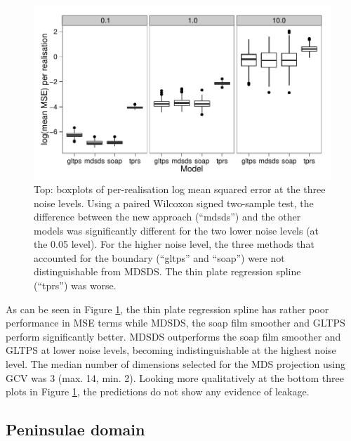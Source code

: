 \documentclass[useAMS, referee]{biom}
\begin{document}
\begin{figure}
\centering
\includegraphics[width=\textwidth]{examples/ramsay/ramsay-result.pdf}
\caption{Top: boxplots of per-realisation log mean squared error at the three noise levels. Using a paired Wilcoxon signed two-sample test, the difference between the new approach (``mdsds'') and the other models was significantly different for the two lower noise levels (at the 0.05 level). For the higher noise level, the three methods that accounted for the boundary (``gltps'' and ``soap'') were not distinguishable from MDSDS. The thin plate regression spline (``tprs'') was worse.
\label{ramsay-results}}
\end{figure}

As can be seen in Figure \ref{ramsay-results}, the thin plate regression spline has rather poor performance in MSE terms while MDSDS, the soap film smoother and GLTPS perform significantly better. MDSDS outperforms the soap film smoother and GLTPS at lower noise levels, becoming indistinguishable at the highest noise level. The median number of dimensions selected for the MDS projection using GCV was 3 (max. 14, min. 2). Looking more qualitatively at the bottom three plots in Figure \ref{ramsay-results}, the predictions do not show any evidence of leakage.


\subsection{Peninsulae domain}
\end{document}
